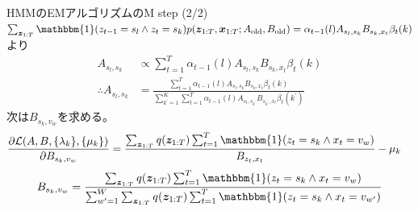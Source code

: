 \documentclass[aspectratio=169,unicode,dvipdfmx,14pt]{beamer}
\begin{document}
\begin{frame}{HMMのEMアルゴリズムのM step (2/2)}
\FontMath
$\sum_{\bm{z}_{1:T}}\mathbbm{1}( z_{t-1} = s_l \wedge z_t = s_k ) 
p(\bm{z}_{1:T} , \bm{x}_{1:T}; A_{\mbox{\scriptsize old}}, B_{\mbox{\scriptsize old}})
= \alpha_{t-1}(l) A_{s_l,s_k} B_{s_k,x_t} \beta_t(k)$より
\begin{align}
A_{s_l, s_k} & \propto \sum_{t=1}^T \alpha_{t-1}(l) A_{s_l,s_k} B_{s_k,x_t} \beta_t(k)
\\
\therefore A_{s_l, s_k} & = 
\frac{ \sum_{t=1}^T \alpha_{t-1}(l) A_{s_l,s_k} B_{s_k,x_t} \beta_t(k) }
{ \sum_{k^\prime=1}^K \sum_{t=1}^T \alpha_{t-1}(l) A_{s_l,s_{k^\prime}} B_{s_{k^\prime},x_t} \beta_t(k^\prime) }
\end{align}
次は$B_{s_k,v_w}$を求める。
\begin{align}
\frac{\partial \mathcal{L}(A, B, \{ \lambda_k \} , \{ \mu_k \}) }{\partial B_{s_k, v_w}}
& = 
\frac{ \sum_{\bm{z}_{1:T}} q(\bm{z}_{1:T}) \sum_{t=1}^T 
\mathbbm{1}( z_t = s_k \wedge x_t = v_w ) }{ B_{z_t,x_t} }
- \mu_k
\end{align}
\begin{align}
B_{s_k, v_w} = \frac{
\sum_{\bm{z}_{1:T}} q(\bm{z}_{1:T}) \sum_{t=1}^T 
\mathbbm{1}( z_t = s_k \wedge x_t = v_w ) }{
\sum_{w^\prime=1}^W \sum_{\bm{z}_{1:T}} q(\bm{z}_{1:T}) \sum_{t=1}^T 
\mathbbm{1}( z_t = s_k \wedge x_t = v_{w^\prime} ) }
\end{align}
\end{frame}
\end{document}
